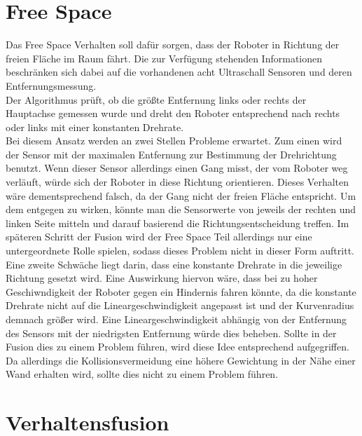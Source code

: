 \documentclass[12pt, a4paper]{report}
\begin{document}
\section{Free Space}

Das Free Space Verhalten soll dafür sorgen, dass der Roboter in Richtung der freien Fläche im Raum fährt. Die zur Verfügung stehenden Informationen beschränken sich dabei auf die vorhandenen acht Ultraschall Sensoren und deren Entfernungsmessung.
\\
Der Algorithmus prüft, ob die größte Entfernung links oder rechts der Hauptachse gemessen wurde und dreht den Roboter entsprechend nach rechts oder links mit einer konstanten Drehrate. 
\\
Bei diesem Ansatz werden an zwei Stellen Probleme erwartet. Zum einen wird der Sensor mit der maximalen Entfernung zur Bestimmung der Drehrichtung benutzt. Wenn dieser Sensor allerdings einen Gang misst, der vom Roboter weg verläuft, würde sich der Roboter in diese Richtung orientieren. Dieses Verhalten wäre dementsprechend falsch, da der Gang nicht der freien Fläche entspricht. Um dem entgegen zu wirken, könnte man die Sensorwerte von jeweils der rechten und linken Seite mitteln und darauf basierend die Richtungsentscheidung treffen. Im späteren Schritt der Fusion wird der Free Space Teil allerdings nur eine untergeordnete Rolle spielen, sodass dieses Problem nicht in dieser Form auftritt.\\
Eine zweite Schwäche liegt darin, dass eine konstante Drehrate in die jeweilige Richtung gesetzt wird. Eine Auswirkung hiervon wäre, dass bei zu hoher Geschiwndigkeit der Roboter gegen ein Hindernis fahren könnte, da die konstante Drehrate nicht auf die Lineargeschwindigkeit angepasst ist und der Kurvenradius demnach größer wird. Eine Lineargeschwindigkeit abhängig von der Entfernung des Sensors mit der niedrigsten Entfernung würde dies beheben. Sollte in der Fusion dies zu einem Problem führen, wird diese Idee entsprechend aufgegriffen. Da allerdings die Kollisionsvermeidung eine höhere Gewichtung in der Nähe einer Wand erhalten wird, sollte dies nicht zu einem Problem führen.


\section*{Verhaltensfusion}
\end{document}
